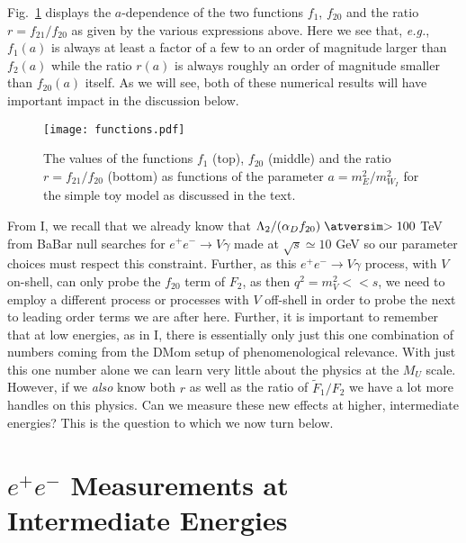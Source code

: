 \documentclass[14pt]{article}
\def\eg{{\it e.g.}}
\def\to{\rightarrow}
\def\matth{\mathsurround=0pt}
\def\gsim{\mathrel{\mathpalette\atversim>}}
\def\atversim#1#2{\lower0.7ex\vbox{\baselineskip\zatskip\lineskip\zatskip
  \lineskiplimit 0pt\ialign{$\matth#1\hfil##\hfil$\crcr#2\crcr\sim\crcr}}}
\begin{document}
{Fig.~\ref{fig5} displays the $a$-dependence of the two functions $f_1$, $f_{20}$ and the ratio $r=f_{21}/f_{20}$ as given by the various expressions above. Here we see that, \eg, $f_1(a)$ is 
always at least a factor of a few to an order of magnitude larger than $f_{2}(a)$ while the ratio $r(a)$ is always roughly an order of magnitude smaller than $f_{20}(a)$ itself. As we will see, both 
of these numerical results will have important impact in the discussion below. 

%
\begin{figure}[htbp]
\centerline{\texttt{[image: functions.pdf]}}
\vspace*{-1.3cm}
\caption{The values of the functions $f_1$ (top), $f_{20}$ (middle) and the ratio $r=f_{21}/f_{20}$ (bottom) as functions of the parameter $a=m_E^2/m_{W_I}^2$ for the simple toy model as 
discussed in the text.}
\label{fig5}
\end{figure}
%

From I, we recall that we already know that $\Lambda_2/(\alpha_D f_{20})\gsim100$ TeV from BaBar null searches for $e^+e^-\to V\gamma$ made at $\sqrt s \simeq 10$ GeV\cite{Lees:2017lec} 
so our parameter choices must respect this constraint. Further, as this $e^+e^-\to V\gamma$ process, with $V$ on-shell, can only probe the $f_{20}$ term of $F_2$, as then $q^2=m_V^2 << s$, 
we need to employ a different process or processes with $V$ off-shell in order to probe the next to leading order terms we are after here. Further, 
it is important to remember that at low energies, as in I, there is essentially only just this one combination of numbers coming from the DMom setup of phenomenological relevance.  With just this one 
number alone we can learn very little about the physics at the $M_U$ scale. However, if we {\it also} know both $r$ as well as the ratio of $\tilde F_1/F_2$ we have a lot more handles on this physics. Can 
we measure these new effects at higher, intermediate energies? This is the question to which we now turn below.



\section{$e^+e^-$ Measurements at Intermediate Energies}


}
\end{document}

